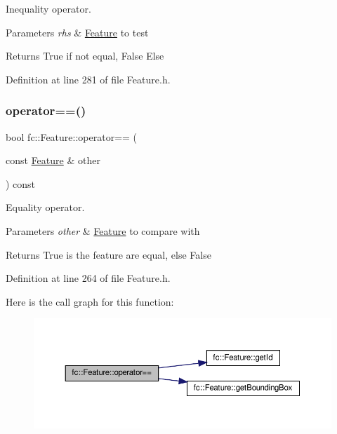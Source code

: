 Inequality operator. 


\begin{DoxyParams}{Parameters}
{\em rhs} & \hyperlink{classfc_1_1Feature}{Feature} to test \\
\hline
\end{DoxyParams}
\begin{DoxyReturn}{Returns}
True if not equal, False Else 
\end{DoxyReturn}


Definition at line 281 of file Feature.\+h.

\mbox{\label{classfc_1_1Feature_aba149cb57c347382caee231a8637f2a3}} 
\subsubsection{\texorpdfstring{operator==()}{operator==()}}
{\footnotesize\ttfamily bool fc\+::\+Feature\+::operator== (\begin{DoxyParamCaption}\item[{const \hyperlink{classfc_1_1Feature}{Feature} \&}]{other }\end{DoxyParamCaption}) const\hspace{0.3cm}{\ttfamily [inline]}}



Equality operator. 


\begin{DoxyParams}{Parameters}
{\em other} & \hyperlink{classfc_1_1Feature}{Feature} to compare with \\
\hline
\end{DoxyParams}
\begin{DoxyReturn}{Returns}
True is the feature are equal, else False 
\end{DoxyReturn}


Definition at line 264 of file Feature.\+h.

Here is the call graph for this function\+:
\nopagebreak
\begin{figure}[H]
\begin{center}
\leavevmode
\includegraphics[width=350pt]{d7/d71/classfc_1_1Feature_aba149cb57c347382caee231a8637f2a3_cgraph}
\end{center}
\end{figure}
\mbox{\label{classfc_1_1Feature_ac37080e8b096f9d2024e761f18495578}} 
